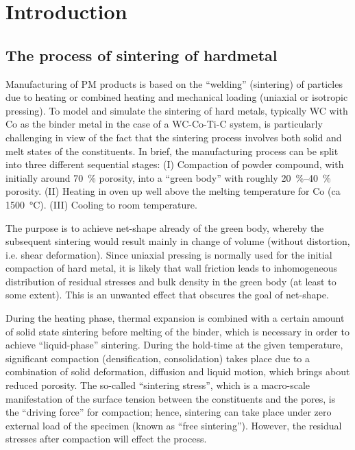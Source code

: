 \documentclass[ExampleMasters.tex]{subfiles}
\begin{document}
\chapter{Introduction}

\section{The process of sintering of hardmetal}

Manufacturing of PM products is based on the ``welding'' (sintering) of particles due to heating or combined heating and mechanical loading (uniaxial or isotropic pressing).
To model and simulate the sintering of hard metals, typically WC with Co as the binder metal in the case of a WC-Co-Ti-C system, is particularly challenging in view of the fact that the sintering process involves both solid and melt states of the constituents.
In brief, the manufacturing process can be split into three different sequential stages:
(I) Compaction of powder compound, with initially around \SI{70}{\percent} porosity, into a ``green body'' with roughly \SIrange{20}{40}{\percent} porosity.
(II) Heating in oven up well above the melting temperature for Co (ca \SI{1500}{\celsius}).
(III) Cooling to room temperature.

The purpose is to achieve net-shape already of the green body, whereby the subsequent sintering would result mainly in change of volume (without distortion, i.e. shear deformation).
Since uniaxial pressing is normally used for the initial compaction of hard metal, it is likely that wall friction leads to inhomogeneous
distribution of residual stresses and bulk density in the green body (at least to some extent).
This is an unwanted effect that obscures the goal of net-shape.

During the heating phase, thermal expansion is combined with a certain amount of solid state sintering before melting of the binder, which is necessary in order to achieve ``liquid-phase'' sintering.
During the hold-time at the given temperature, significant compaction (densification, consolidation) takes place due to a combination of solid deformation, diffusion and liquid motion, which brings about reduced porosity.
The so-called ``sintering stress'', which is a macro-scale manifestation of the surface tension between the constituents and the pores, is the ``driving force'' for compaction; hence, sintering can take place under zero external load of the specimen (known as ``free sintering'').
However, the residual stresses after compaction will effect the process.
\end{document}
